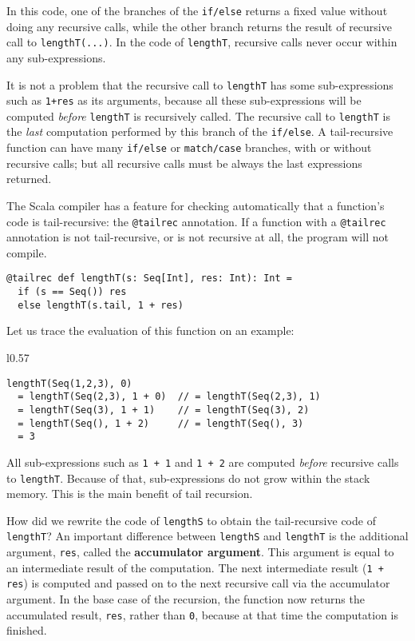 \noindent In this code, one of the branches of the \lstinline!if/else!
returns a fixed value without doing any recursive calls, while the
other branch returns the result of recursive call to \lstinline!lengthT(...)!.
In the code of \lstinline!lengthT!, recursive calls never occur within
any sub-expressions.

It is not a problem that the recursive call to \lstinline!lengthT!
has some sub-expressions such as \lstinline!1+res! as its arguments,
because all these sub-expressions will be computed \emph{before} \lstinline!lengthT!
is recursively called. The recursive call to \lstinline!lengthT!
is the \emph{last} computation performed by this branch of the \lstinline!if/else!.
A tail-recursive function can have many \lstinline!if/else! or \lstinline!match/case!
branches, with or without recursive calls; but all recursive calls
must be always the last expressions returned.

The Scala compiler has a feature for checking automatically that a
function's code is tail-recursive: the \lstinline!@tailrec! annotation.
If a function with a \lstinline!@tailrec! annotation is not tail-recursive,
or is not recursive at all, the program will not compile.
\begin{lstlisting}
@tailrec def lengthT(s: Seq[Int], res: Int): Int = 
  if (s == Seq()) res
  else lengthT(s.tail, 1 + res)
\end{lstlisting}
Let us trace the evaluation of this function on an example:

\begin{wrapfigure}{l}{0.57\columnwidth}%
\vspace{-0.8\baselineskip}
\begin{lstlisting}
lengthT(Seq(1,2,3), 0)
  = lengthT(Seq(2,3), 1 + 0)  // = lengthT(Seq(2,3), 1)
  = lengthT(Seq(3), 1 + 1)    // = lengthT(Seq(3), 2)
  = lengthT(Seq(), 1 + 2)     // = lengthT(Seq(), 3)
  = 3
\end{lstlisting}

\vspace{-1.5\baselineskip}
\end{wrapfigure}%

\noindent All sub-expressions such as \lstinline!1 + 1! and \lstinline!1 + 2!
are computed \emph{before} recursive calls to \lstinline!lengthT!.
Because of that, sub-expressions do not grow within the stack memory.
This is the main benefit of tail recursion.

How did we rewrite the code of \lstinline!lengthS! to obtain the
tail-recursive code of \lstinline!lengthT!? An important difference
between \lstinline!lengthS! and \lstinline!lengthT! is the additional
argument, \lstinline!res!, called the \textbf{accumulator argument}.
This argument is equal to an intermediate result of the computation.
The next intermediate result (\lstinline!1 + res!) is computed and
passed on to the next recursive call via the accumulator argument.
In the base case of the recursion, the function now returns the accumulated
result, \lstinline!res!, rather than \lstinline!0!, because at that
time the computation is finished.

